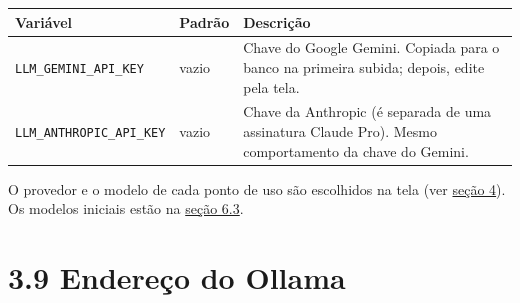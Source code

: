 \documentclass[
  brazilian,
  a4paper,12pt,oneside]{report}
\newcounter{none} %
\begin{document}
{\def\LTcaptype{none} %
\begin{longtable}[]{@{}
  >{\raggedright\arraybackslash}p{}
  >{\raggedright\arraybackslash}p{}
  >{\raggedright\arraybackslash}p{}@{}}
\toprule\noalign{}
\begin{minipage}[b]{\linewidth}\raggedright
Variável
\end{minipage} & \begin{minipage}[b]{\linewidth}\raggedright
Padrão
\end{minipage} & \begin{minipage}[b]{\linewidth}\raggedright
Descrição
\end{minipage} \\
\midrule\noalign{}
\endhead
\bottomrule\noalign{}
\endlastfoot
\texttt{LLM\_}\allowbreak{}\texttt{GEMINI\_}\allowbreak{}\texttt{API\_}\allowbreak{}\texttt{KEY}
& vazio & Chave do Google Gemini. Copiada para o banco na primeira
subida; depois, edite pela tela. \\
\texttt{LLM\_}\allowbreak{}\texttt{ANTHROPIC\_}\allowbreak{}\texttt{API\_}\allowbreak{}\texttt{KEY}
& vazio & Chave da Anthropic (é separada de uma assinatura Claude Pro).
Mesmo comportamento da chave do Gemini. \\
\end{longtable}
}

O provedor e o modelo de cada ponto de uso são escolhidos na tela (ver
\hyperref[4-provedores-de-ia]{seção 4}). Os modelos iniciais estão na
\hyperref[63-inteliguxeancia-artificial]{seção 6.3}.

\section{3.9 Endereço do Ollama}\label{endereuxe7o-do-ollama}
\end{document}
